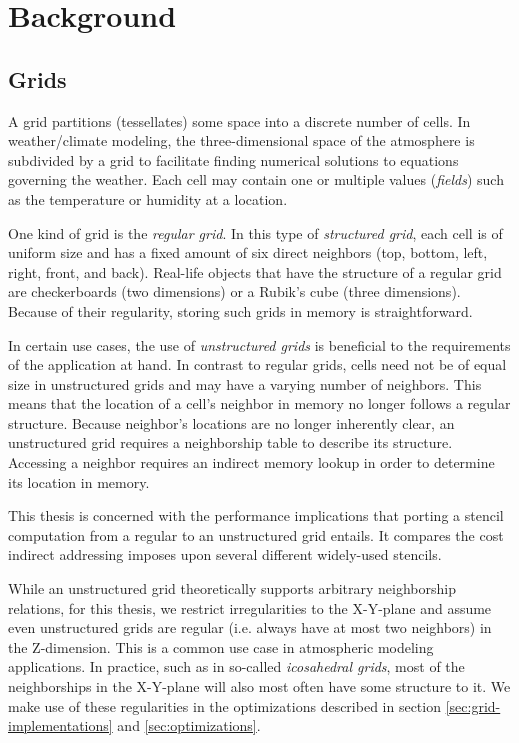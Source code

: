 \chapter{Background}                                    \label{sec:foundations}

\section{Grids}                                            \label{sec:grids}

A grid partitions (tessellates) some space into a discrete number of cells. In weather/climate modeling, the three-dimensional space of the atmosphere is subdivided by a grid to facilitate finding numerical solutions to equations governing the weather. Each cell may contain one or multiple values (\emph{fields}) such as the temperature or humidity at a location.

One kind of grid is the \emph{regular grid}. In this type of \emph{structured grid}, each cell is of uniform size and has a fixed amount of six direct neighbors (top, bottom, left, right, front, and back). Real-life objects that have the structure of a regular grid are checkerboards (two dimensions) or a Rubik's cube (three dimensions). Because of their regularity, storing such grids in memory is straightforward.

In certain use cases, the use of \emph{unstructured grids} is beneficial to the requirements of the application at hand. In contrast to regular grids, cells need not be of equal size in unstructured grids and may have a varying number of neighbors. This means that the location of a cell's neighbor in memory no longer follows a regular structure. Because neighbor's locations are no longer inherently clear, an unstructured grid requires a neighborship table to describe its structure. Accessing a neighbor requires an indirect memory lookup in order to determine its location in memory.

This thesis is concerned with the performance implications that porting a stencil computation from a regular to an unstructured grid entails. It compares the cost indirect addressing imposes upon several different widely-used stencils.

While an unstructured grid theoretically supports arbitrary neighborship relations, for this thesis, we restrict irregularities to the X-Y-plane and assume even unstructured grids are regular (i.e. always have at most two neighbors) in the Z-dimension. This is a common use case in atmospheric modeling applications. In practice, such as in so-called \emph{icosahedral grids}, most of the neighborships in the X-Y-plane will also most often have some structure to it. We make use of these regularities in the optimizations described in section \ref{sec:grid-implementations} and \ref{sec:optimizations}.


